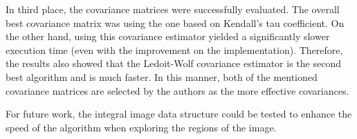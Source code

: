 \documentclass[11pt]{article}
\theoremstyle{definition}
\theoremstyle{remark}
\theoremstyle{remark}
\theoremstyle{remark}
\begin{document}
In third place, the covariance matrices were successfully evaluated. The overall
best covariance matrix was using the one based on Kendall's tau coefficient. On
the other hand, using this covariance estimator yielded a significantly slower
execution time (even with the improvement on the implementation). Therefore, the
results also showed that the Ledoit-Wolf covariance estimator is the second best
algorithm and is much faster. In this manner, both of the mentioned covariance
matrices are selected by the authors as the more effective covariances.

For future work, the integral image data structure
\parencite{porikli2005integral} could be tested to enhance the speed of the
algorithm when exploring the regions of the image.

\printbibliography
\end{document}
